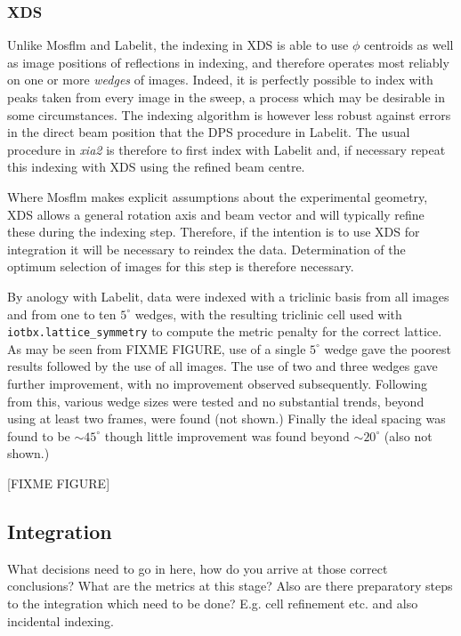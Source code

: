 \documentclass[a4paper,11pt]{article}
\begin{document}
\subsubsection{XDS}

Unlike Mosflm and Labelit, the indexing in XDS is able to use $\phi$
centroids as well as image positions of reflections in indexing, and
therefore operates most reliably on one or more \emph{wedges} of
images. Indeed, it is perfectly possible to index with peaks taken
from every image in the sweep, a process which may be desirable in some
circumstances. The indexing algorithm is however less robust against
errors in the direct beam position that the DPS procedure in
Labelit. The usual procedure in \emph{xia2} is therefore to first
index with Labelit and, if necessary repeat this indexing with XDS
using the refined beam centre. 

Where Mosflm makes explicit assumptions about the experimental
geometry, XDS allows a general rotation axis and beam vector and will
typically refine these during the indexing step. Therefore, if the
intention is to use XDS for integration it will be necessary to
reindex the data. Determination of the optimum selection of images for
this step is therefore necessary.

By anology with Labelit, data were indexed with a triclinic basis
from all images and from one to ten $5^{\circ}$ wedges, with the
resulting triclinic cell used with \verb|iotbx.lattice_symmetry| to
compute the metric penalty for the correct lattice. As may be seen
from FIXME FIGURE, use of a single $5^{\circ}$ wedge gave the poorest
results followed by the use of all images. The use of two and three
wedges gave further improvement, with no improvement observed
subsequently. Following from this, various wedge sizes were tested and
no substantial trends, beyond using at least two frames, were found
(not shown.) Finally the ideal spacing was found to be $\sim
45^{\circ}$ though little improvement was found beyond $\sim
20^{\circ}$ (also not shown.)  

[FIXME FIGURE]

\subsection{Integration}

What decisions need to go in here, how do you arrive at those correct
conclusions? What are the metrics at this stage? Also are there
preparatory steps to the integration which need to be done? E.g. cell
refinement etc. and also incidental indexing.
\end{document}
